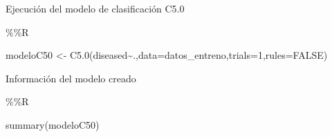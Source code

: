 \documentclass[
  11pt,
  a4paper,
]{article}
\newenvironment{Shaded}{\begin{snugshade}}{\end{snugshade}}
\newcommand{\AttributeTok}[1]{\textcolor[rgb]{0.77,0.63,0.00}{#1}}
\newcommand{\ConstantTok}[1]{\textcolor[rgb]{0.00,0.00,0.00}{#1}}
\newcommand{\DecValTok}[1]{\textcolor[rgb]{0.00,0.00,0.81}{#1}}
\newcommand{\FunctionTok}[1]{\textcolor[rgb]{0.00,0.00,0.00}{#1}}
\newcommand{\NormalTok}[1]{#1}
\newcommand{\OtherTok}[1]{\textcolor[rgb]{0.56,0.35,0.01}{#1}}
\newcommand{\SpecialCharTok}[1]{\textcolor[rgb]{0.00,0.00,0.00}{#1}}
\begin{document}
Ejecución del modelo de clasificación C5.0

\begin{Shaded}
\begin{Highlighting}[]
\SpecialCharTok{\%\%}\NormalTok{R}

\NormalTok{modeloC50 }\OtherTok{\textless{}{-}} \FunctionTok{C5.0}\NormalTok{(diseased}\SpecialCharTok{\textasciitilde{}}\NormalTok{.,}\AttributeTok{data=}\NormalTok{datos\_entreno,}\AttributeTok{trials=}\DecValTok{1}\NormalTok{,}\AttributeTok{rules=}\ConstantTok{FALSE}\NormalTok{)}
\end{Highlighting}
\end{Shaded}

\newpage

Información del modelo creado

\begin{Shaded}
\begin{Highlighting}[]
\SpecialCharTok{\%\%}\NormalTok{R}

\FunctionTok{summary}\NormalTok{(modeloC50)}
\end{Highlighting}
\end{Shaded}
\end{document}
